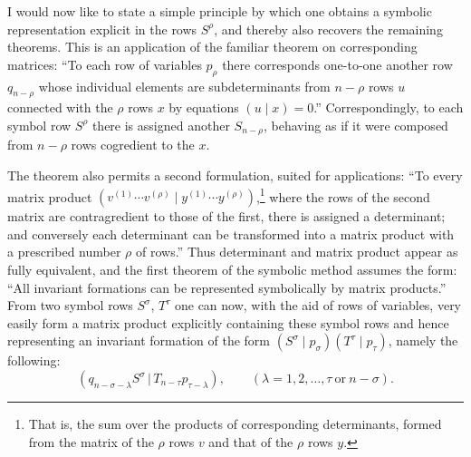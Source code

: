 \documentclass[11pt]{article}
\newcommand{\pair}[2]{(#1\,|\,#2)}
\begin{document}
I would now like to state a simple principle by which one obtains a symbolic representation explicit in the rows $S^\rho$, and thereby also recovers the remaining theorems. This is an application of the familiar theorem on corresponding matrices: ``To each row of variables $p_\rho$ there corresponds one-to-one another row $q_{n-\rho}$ whose individual elements are subdeterminants from $n-\rho$ rows $u$ connected with the $\rho$ rows $x$ by equations $(u\mid x)=0$.'' Correspondingly, to each symbol row $S^\rho$ there is assigned another $S_{n-\rho}$, behaving as if it were composed from $n-\rho$ rows cogredient to the $x$.

The theorem also permits a second formulation, suited for applications: ``To every matrix product $(v^{(1)}\cdots v^{(\rho)}\mid y^{(1)}\cdots y^{(\rho)})$,\footnote{That is, the sum over the products of corresponding determinants, formed from the matrix of the $\rho$ rows $v$ and that of the $\rho$ rows $y$.} where the rows of the second matrix are contragredient to those of the first, there is assigned a determinant; and conversely each determinant can be transformed into a matrix product with a prescribed number $\rho$ of rows.'' Thus determinant and matrix product appear as fully equivalent, and the first theorem of the symbolic method assumes the form: ``All invariant formations can be represented symbolically by matrix products.'' From two symbol rows $S^\sigma$, $T^\tau$ one can now, with the aid of rows of variables, very easily form a matrix product explicitly containing these symbol rows and hence representing an invariant formation of the form $(S^\sigma\mid p_\sigma)(T^\tau\mid p_\tau)$, namely the following:
\begin{equation}
 \pair{q_{n-\sigma-\lambda}S^\sigma}{T_{n-\tau}p_{\tau-\lambda}},
 \qquad (\lambda=1,2,\ldots,\tau\ \text{or}\ n-\sigma).
\tag{1}
\end{equation}
\end{document}
